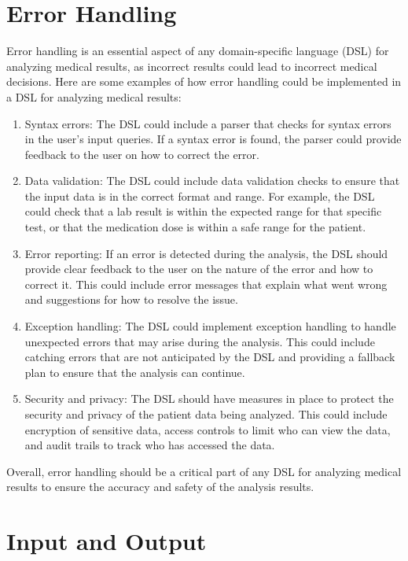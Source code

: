 \section{Error Handling}
Error handling is an essential aspect of any domain-specific language (DSL) for analyzing medical results, as incorrect results could lead to incorrect medical decisions. Here are some examples of how error handling could be implemented in a DSL for analyzing medical results:
\begin{enumerate}
    \item Syntax errors: The DSL could include a parser that checks for syntax errors in the user's input queries. If a syntax error is found, the parser could provide feedback to the user on how to correct the error.

    \item Data validation: The DSL could include data validation checks to ensure that the input data is in the correct format and range. For example, the DSL could check that a lab result is within the expected range for that specific test, or that the medication dose is within a safe range for the patient.

    \item Error reporting: If an error is detected during the analysis, the DSL should provide clear feedback to the user on the nature of the error and how to correct it. This could include error messages that explain what went wrong and suggestions for how to resolve the issue.

    \item Exception handling: The DSL could implement exception handling to handle unexpected errors that may arise during the analysis. This could include catching errors that are not anticipated by the DSL and providing a fallback plan to ensure that the analysis can continue.

    \item Security and privacy: The DSL should have measures in place to protect the security and privacy of the patient data being analyzed. This could include encryption of sensitive data, access controls to limit who can view the data, and audit trails to track who has accessed the data.
\end{enumerate}
Overall, error handling should be a critical part of any DSL for analyzing medical results to ensure the accuracy and safety of the analysis results.

\vspace{0.5cm}
\section{Input and Output}

